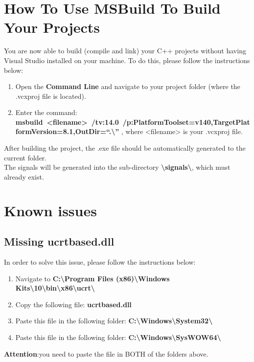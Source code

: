 \section{How To Use MSBuild To Build Your Projects}
  You are now able to build (compile and link) your C++ projects without having Visual Studio installed on your machine.
  To do this, please follow the instructions below:
  \begin{enumerate}
    \item Open the \textbf{Command Line} and navigate to your project folder (where the .vcxproj file is located).
    \item Enter the command:\\ \hbox{\textbf{msbuild <filename> /tv:14.0 /p:PlatformToolset=v140,TargetPlatformVersion=8.1,OutDir=``.\textbackslash{}''}} , where <filename> is your .vcxproj file.
  \end{enumerate}
  After building the project, the .exe file should be automatically generated to the current folder.\\
  The signals will be generated into the sub-directory \textbf{\textbackslash{}signals\textbackslash{}}, which must already exist.
\section{Known issues}
  \subsection{Missing ucrtbased.dll}
  In order to solve this issue, please follow the instructions below:
  \begin{enumerate}
     \item Navigate to \textbf{C:\textbackslash{}Program Files (x86)\textbackslash{}Windows Kits\textbackslash{}10\textbackslash{}bin\textbackslash{}x86\textbackslash{}ucrt\textbackslash{}}
     \item Copy the following file: \textbf{ucrtbased.dll}
     \item Paste this file in the following folder: \textbf{C:\textbackslash{}Windows\textbackslash{}System32\textbackslash{}}
     \item Paste this file in the following folder: \textbf{C:\textbackslash{}Windows\textbackslash{}SysWOW64\textbackslash{}}
   \end{enumerate}
   \textbf{Attention}:you need to paste the file in BOTH of the folders above.
